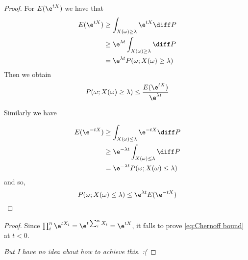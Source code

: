     \begin{subproblem}
        \item
        \begin{proof}
            For $E(\e^{tX})$ we have that
            \begin{align*}
                E(\e^{tX})&\geq\int_{X(\omega)\geq\lambda}\e^{tX}\diff P\\
                &\geq\e^{\lambda t}\int_{X(\omega)\geq\lambda}\diff P\\
                &=\e^{\lambda t}P(\omega;X(\omega)\geq\lambda)
            \end{align*}
            Then we obtain
            \begin{equation}
                \label{eq:Chernoff bound}
                P(\omega;X(\omega)\geq\lambda)\leq\frac{E(\e^{tX})}{\e^{\lambda t}}
            \end{equation}

            Similarly we have

            \begin{align*}
                E(\e^{-tX})&\geq\int_{X(\omega)\leq\lambda}\e^{-tX}\diff P\\
                &\geq\e^{-\lambda t}\int_{X(\omega)\leq\lambda}\diff P\\
                &=\e^{-\lambda t}P(\omega;X(\omega)\leq\lambda)
            \end{align*}
            and so,
            \[P(\omega;X(\omega)\leq\lambda)\leq\e^{\lambda t}E(\e^{-tX})\]
        \end{proof}

        \item
        \begin{proof}
            Since $\prod_i^n\e^{tX_i}=\e^{t\sum_i^n X_i}=\e^{tX}$,
            it falls to prove \cref{eq:Chernoff bound} at $t<0$.

            \emph{But I have no idea about how to achieve this. :(}
        \end{proof}
    \end{subproblem}

